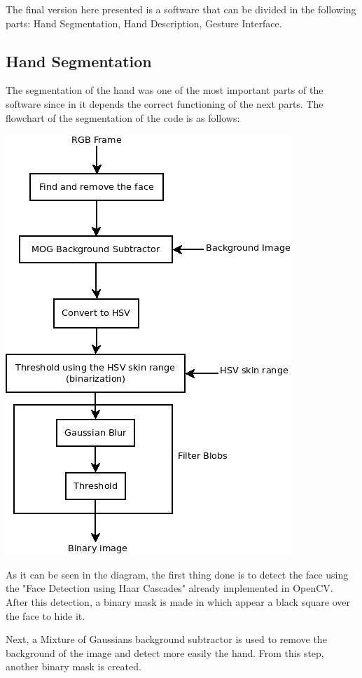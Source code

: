 \documentclass{article}
\begin{document}
The final version here presented is a software that can be divided in the following parts: Hand Segmentation, Hand Description, Gesture Interface.

\subsection{Hand Segmentation}
The segmentation of the hand was one of the most important parts of the software since in it depends the correct functioning of the next parts. 
The flowchart of the segmentation of the code is as follows: 

\begin{center}
 \includegraphics[scale=0.4]{../hand_filter.jpeg} 
 \end{center} 
 
As it can be seen in the diagram, the first thing done is to detect the face using the "Face Detection using Haar Cascades" already implemented in OpenCV. After this detection, a binary mask is made in which appear a black square over the face to hide it.

Next, a Mixture of Gaussians background subtractor is used to remove the background of the image and detect more easily the hand. From this step, another binary mask is created. 
\end{document}
